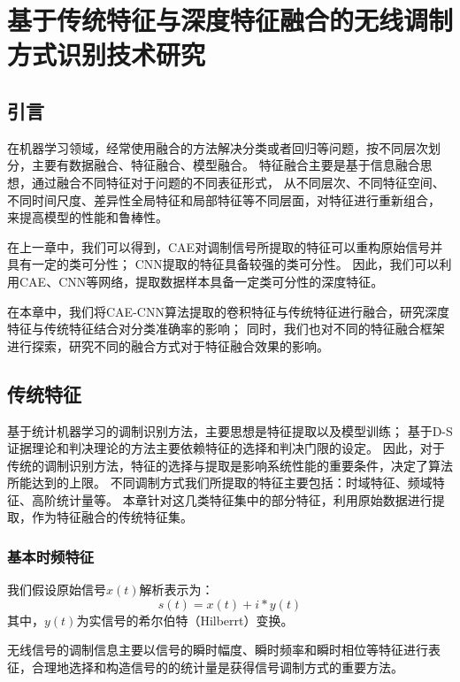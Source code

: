 \chapter{基于传统特征与深度特征融合的无线调制方式识别技术研究}
\section{引言}
在机器学习领域，经常使用融合的方法解决分类或者回归等问题，按不同层次划分，主要有数据融合、特征融合、模型融合。
特征融合主要是基于信息融合思想，通过融合不同特征对于问题的不同表征形式，
从不同层次、不同特征空间、不同时间尺度、差异性全局特征和局部特征等不同层面，对特征进行重新组合，
来提高模型的性能和鲁棒性\cite{刘渭滨2017模式分类中的特征融合方法}。\par

在上一章中，我们可以得到，CAE对调制信号所提取的特征可以重构原始信号并具有一定的类可分性；
CNN提取的特征具备较强的类可分性。
因此，我们可以利用CAE、CNN等网络，提取数据样本具备一定类可分性的深度特征。\par

在本章中，我们将CAE-CNN算法提取的卷积特征与传统特征进行融合，研究深度特征与传统特征结合对分类准确率的影响；
同时，我们也对不同的特征融合框架进行探索，研究不同的融合方式对于特征融合效果的影响。\par

\section{传统特征}
基于统计机器学习的调制识别方法，主要思想是特征提取以及模型训练；
基于D-S证据理论和判决理论的方法主要依赖特征的选择和判决门限的设定。
因此，对于传统的调制识别方法，特征的选择与提取是影响系统性能的重要条件，决定了算法所能达到的上限。
不同调制方式我们所提取的特征主要包括：时域特征、频域特征、高阶统计量等。
本章针对这几类特征集中的部分特征，利用原始数据进行提取，作为特征融合的传统特征集。\par

\subsection{基本时频特征}

我们假设原始信号$x(t)$解析表示为：
\begin{equation}
\label{eqt_4_1}
s(t)=x(t)+i*y(t)
\end{equation}
其中，$y(t)$为实信号的希尔伯特（Hilberrt）变换。\par

无线信号的调制信息主要以信号的瞬时幅度、瞬时频率和瞬时相位等特征进行表征，合理地选择和构造信号的的统计量是获得信号调制方式的重要方法\cite{杨杰2014通信信号调制识别}。\par

